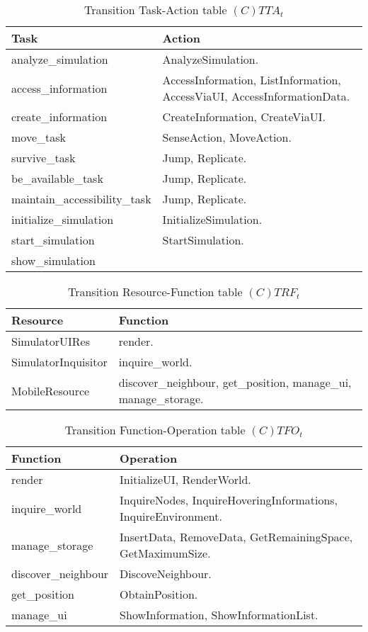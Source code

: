 \begin{table}[H]
	\centering
	\begin{tabular}{|p{4cm}|p{8cm}|}
			\hline
			\textbf{Task} & \textbf{Action} \\
			\hline
			analyze\_simulation & AnalyzeSimulation. \\
			\hline
			access\_information & AccessInformation, ListInformation, AccessViaUI,
			AccessInformationData.\\
			\hline
			create\_information & CreateInformation, CreateViaUI. \\
			\hline
			move\_task & SenseAction, MoveAction. \\
			\hline
			survive\_task & Jump, Replicate. \\
			\hline
			be\_available\_task & Jump, Replicate. \\
			\hline
			maintain\_accessibility\_task & Jump, Replicate. \\
			\hline
			initialize\_simulation & InitializeSimulation. \\
			\hline
			start\_simulation & StartSimulation. \\
			\hline
			show\_simulation & \\
			\hline
		\end{tabular}
	\caption{Transition Task-Action table $(C)TTA_t$}
	\label{tab:cttat}
\end{table}

\begin{table}[H]
	\centering
	\begin{tabular}{|p{4cm}|p{8cm}|}
			\hline
			\textbf{Resource} & \textbf{Function} \\
			\hline
			SimulatorUIRes & render. \\
			\hline
			SimulatorInquisitor & inquire\_world. \\
			\hline
			MobileResource & discover\_neighbour, get\_position, manage\_ui,
			manage\_storage. \\
			\hline
		\end{tabular}
	\caption{Transition Resource-Function table $(C)TRF_t$}
	\label{tab:ctrft}
\end{table}

\begin{table}[H]
	\centering
	\begin{tabular}{|p{4cm}|p{8cm}|}
			\hline
			\textbf{Function} & \textbf{Operation} \\
			\hline
			render & InitializeUI, RenderWorld. \\
			\hline
			inquire\_world & InquireNodes, InquireHoveringInformations, InquireEnvironment. \\
			\hline
			manage\_storage & InsertData, RemoveData, GetRemainingSpace,
			GetMaximumSize. \\
			\hline
			discover\_neighbour & DiscoveNeighbour. \\
			\hline
			get\_position & ObtainPosition. \\
			\hline
			manage\_ui & ShowInformation, ShowInformationList. \\
			\hline
		\end{tabular}
	\caption{Transition Function-Operation table $(C)TFO_t$}
	\label{tab:ctfot}
\end{table}

